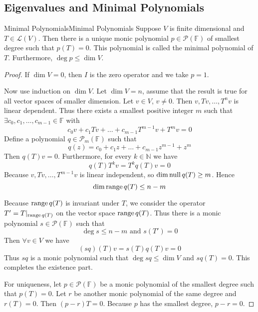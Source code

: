 \documentclass[../main.tex]{subfiles}
\begin{document}
\subsection{Eigenvalues and Minimal Polynomials}
\begin{definition}{Minimal Polynomials}{Minimal Polynomials}
Suppose $V$ is finite dimensional and $T\in \mathscr{L}(V)$. Then there is a unique monic polynomial $p\in \mathscr{P}(\mathbb{F})$ of smallest degree such that $p(T)=0$. This polynomial is called the minimal polynomial of $T$. Furthermore, $\deg p\leq \dim V$.
\end{definition}
\begin{proof}
If $\dim V = 0$, then $I$ is the zero operator and we take $p = 1$.

Now use induction on $\dim V$. Let $\dim V = n$, assume that the result is true for all vector spaces of smaller dimension. Let $v\in V$, $v\neq 0$. Then $v,Tv, \ldots ,T^nv$ is linear dependent. Thus there exists a smallest positive integer $m$ such that $\exists c_0,c_1, \ldots ,c_{m-1}\in \mathbb{F}$ with 
\begin{equation*}
	c_0v+c_1Tv+\ldots +c_{m-1}T^{m-1}v + T^mv = 0
\end{equation*}
Define a polynomial $q\in \mathscr{P}_m(\mathbb{F})$ such that
\begin{equation*}
	q(z) = c_0+c_1z+\ldots +c_{m-1}z^{m-1}+z^m
\end{equation*}
Then $q(T)v=0$. Furthermore, for every $k\in \mathbb{N}$ we have
\begin{equation*}
q(T)T^kv = T^kq(T)v = 0
\end{equation*}
Because $v,Tv, \ldots ,T^{m-1}v$ is linear independent, so $\dim \operatorname{null} q(T) \geq m$. Hence
\begin{equation*}
\dim \operatorname{range} q(T) \leq n-m
\end{equation*}

Because $\operatorname{range} q(T)$ is invariant under $T$, we consider the operator $T' = T|_{\operatorname{range} q(T)}$ on the vector space $\operatorname{range} q(T)$. Thus there is a monic polynomial $s\in \mathscr{P}(\mathbb{F})$ such that
\begin{equation*}
\deg s \leq n-m \text{ and } s(T') = 0
\end{equation*}
Then $\forall v\in V$ we have
\begin{equation*}
	(sq)(T)v = s(T)q(T)v = 0
\end{equation*}
Thus $sq$ is a monic polynomial such that $\deg sq\leq \dim V$ and $sq(T)=0$. This completes the existence part.

For uniqueness, let $p\in \mathscr{P}(\mathbb{F})$ be a monic polynomial of the smallest degree such that $p(T)=0$. Let  $r$ be another monic polynomial of the same degree and $r(T)=0$. Then $(p-r)T = 0$. Because $p$ has the smallest degree, $p-r=0$.
\end{proof}
\end{document}
